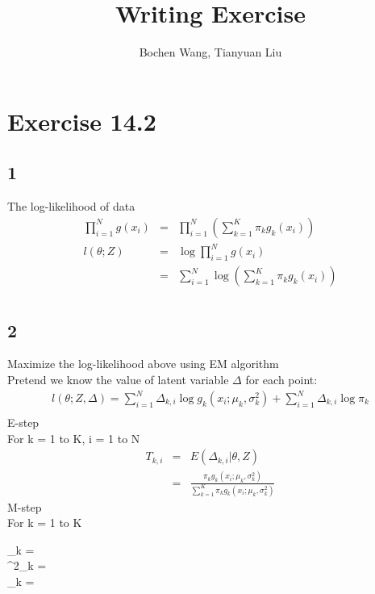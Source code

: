 \documentclass[a4paper]{article}
\begin{document}
\title{Writing Exercise}
\author{Bochen Wang, Tianyuan Liu}
\maketitle
\section*{Exercise 14.2}
\subsection*{1}
The log-likelihood of data \\
\begin{eqnarray*}
	\prod\limits_{i=1}^{N}g(x_i) &=& \prod\limits_{i=1}^{N}(\sum\limits_{k=1}^{K}\pi_k g_k(x_i)) \\
	l(\theta;Z) &=& \log {\prod\limits_{i=1}^{N}g(x_i)} \\
	&=& \sum\limits_{i=1}^{N}\log (\sum\limits_{k=1}^{K}\pi_k g_k(x_i)) \\
\end{eqnarray*} 

\subsection*{2}
Maximize the log-likelihood above using EM algorithm \\
Pretend we know the value of latent variable $ \Delta $ for each point:\\
\begin{align*}
	l(\theta;Z,\Delta) = \sum \limits_{i=1}^{N} \Delta_{k,i} \log g_k(x_i;\mu_k,\sigma_k^2) + \sum \limits_{i=1}^{N} \Delta_{k,i} \log \pi_k  \\
\end{align*}
E-step \\
For k = 1 to K, i = 1 to N\\
\begin{eqnarray*}
	T_{k,i} &=& E(\Delta_{k,i}|\theta,Z) \\
	 &=& \frac{\pi_k g_k(x_i;\mu_k,\sigma_k^2)}{\sum\limits_{k=1}^{K} \pi_k g_k(x_i;\mu_k,\sigma_k^2)} 
\end{eqnarray*}
M-step \\
For k = 1 to K\\
\begin{center}	
	\mu_k =  \\
	\sigma^2_k = \\
	\pi_k =  \\	
\end{center}
\end{document}

